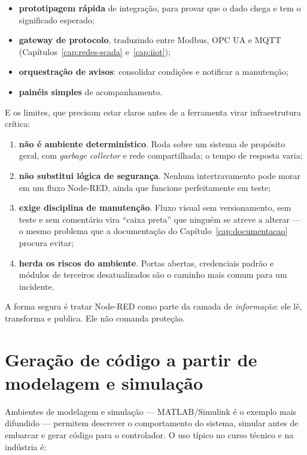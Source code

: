 \begin{itemize}
  \item \textbf{prototipagem rápida} de integração, para provar que o dado chega e tem o significado
        esperado;
  \item \textbf{gateway de protocolo}, traduzindo entre Modbus, OPC UA e MQTT
        (Capítulos~\ref{cap:redes-scada} e~\ref{cap:iiot});
  \item \textbf{orquestração de avisos}: consolidar condições e notificar a manutenção;
  \item \textbf{painéis simples} de acompanhamento.
\end{itemize}

E os limites, que precisam estar claros antes de a ferramenta virar infraestrutura crítica:

\begin{enumerate}
  \item \textbf{não é ambiente determinístico}. Roda sobre um sistema de propósito geral, com
        \emph{garbage collector} e rede compartilhada; o tempo de resposta varia;
  \item \textbf{não substitui lógica de segurança}. Nenhum intertravamento pode morar em um fluxo
        Node-RED, ainda que funcione perfeitamente em teste;
  \item \textbf{exige disciplina de manutenção}. Fluxo visual sem versionamento, sem teste e sem
        comentário vira ``caixa preta'' que ninguém se atreve a alterar --- o mesmo problema que a
        documentação do Capítulo~\ref{cap:documentacao} procura evitar;
  \item \textbf{herda os riscos do ambiente}. Portas abertas, credenciais padrão e módulos de
        terceiros desatualizados são o caminho mais comum para um incidente.
\end{enumerate}

A forma segura é tratar Node-RED como parte da camada de \emph{informação}: ele lê, transforma e
publica. Ele não comanda proteção.

\section{Geração de código a partir de modelagem e simulação}

Ambientes de modelagem e simulação --- MATLAB/Simulink é o exemplo mais difundido --- permitem
descrever o comportamento do sistema, simular antes de embarcar e gerar código para o controlador.
O uso típico no curso técnico e na indústria é:

